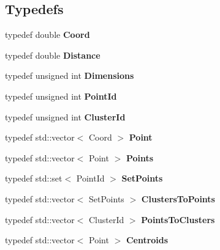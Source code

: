 \subsection*{Typedefs}
\begin{DoxyCompactItemize}
\item 
\hypertarget{namespacekukadu_a53d736e9108e87316673bcfcd8226780}{typedef double {\bfseries Coord}}\label{namespacekukadu_a53d736e9108e87316673bcfcd8226780}

\item 
\hypertarget{namespacekukadu_ae1cbcb147e3dc5064880320c2c9b6dc7}{typedef double {\bfseries Distance}}\label{namespacekukadu_ae1cbcb147e3dc5064880320c2c9b6dc7}

\item 
\hypertarget{namespacekukadu_a728df7f207a3c6b0dfd28d7dd546e5f5}{typedef unsigned int {\bfseries Dimensions}}\label{namespacekukadu_a728df7f207a3c6b0dfd28d7dd546e5f5}

\item 
\hypertarget{namespacekukadu_a02d2fa18ebd7965d7ec4810719c97deb}{typedef unsigned int {\bfseries Point\-Id}}\label{namespacekukadu_a02d2fa18ebd7965d7ec4810719c97deb}

\item 
\hypertarget{namespacekukadu_abd5fe11abfe2df8520174c32f6f2a67b}{typedef unsigned int {\bfseries Cluster\-Id}}\label{namespacekukadu_abd5fe11abfe2df8520174c32f6f2a67b}

\item 
\hypertarget{namespacekukadu_ae56bf75d832d53ac502efb8a21c22144}{typedef std\-::vector$<$ Coord $>$ {\bfseries Point}}\label{namespacekukadu_ae56bf75d832d53ac502efb8a21c22144}

\item 
\hypertarget{namespacekukadu_a031e9cd069e03edfe2dbb746610e8d17}{typedef std\-::vector$<$ Point $>$ {\bfseries Points}}\label{namespacekukadu_a031e9cd069e03edfe2dbb746610e8d17}

\item 
\hypertarget{namespacekukadu_a8e379b5b193ab8a74ca7b690c2831f74}{typedef std\-::set$<$ Point\-Id $>$ {\bfseries Set\-Points}}\label{namespacekukadu_a8e379b5b193ab8a74ca7b690c2831f74}

\item 
\hypertarget{namespacekukadu_af2a88faeb228f7b67112e994a3db8179}{typedef std\-::vector$<$ Set\-Points $>$ {\bfseries Clusters\-To\-Points}}\label{namespacekukadu_af2a88faeb228f7b67112e994a3db8179}

\item 
\hypertarget{namespacekukadu_a5847dd1e58ac4746143040f0733890fc}{typedef std\-::vector$<$ Cluster\-Id $>$ {\bfseries Points\-To\-Clusters}}\label{namespacekukadu_a5847dd1e58ac4746143040f0733890fc}

\item 
\hypertarget{namespacekukadu_a630f7f65e1f9c65949814a0cd297b182}{typedef std\-::vector$<$ Point $>$ {\bfseries Centroids}}\label{namespacekukadu_a630f7f65e1f9c65949814a0cd297b182}

\end{DoxyCompactItemize}
